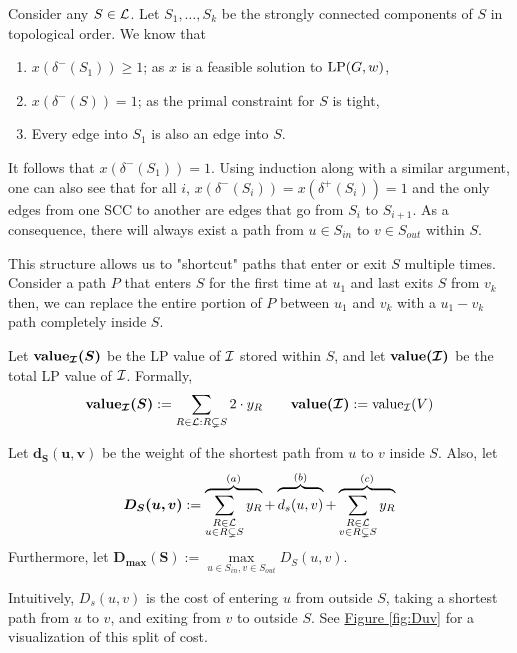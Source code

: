 
	Consider any $S\in \mathcal{L}$. Let $S_1,\dots, S_k$ be the strongly connected components of $S$ in topological order.
	We know that
	\begin{enumerate}
		\item $x(\delta^-(S_1)) \geq 1$; as $x$ is a feasible solution to $\textup{LP}(G,w)$,
		\item $x(\delta^-(S)) = 1$; as the primal constraint for $S$ is tight,
		\item Every edge into $S_1$ is also an edge into $S$.
	\end{enumerate}
	It follows that $x(\delta^-(S_1)) = 1$.
	Using induction along with a similar argument, one can also see that for all $i$, $x(\delta^-(S_i)) = x(\delta^+(S_i)) = 1$ and the only edges from one SCC to another are edges that go from $S_i$ to $S_{i + 1}$.
	As a consequence, there will always exist a path from $u\in S_{in}$ to $v\in S_{out}$ within $S$.

	This structure allows us to "shortcut" paths that enter or exit $S$ multiple times. Consider a path $P$ that enters $S$ for the first time at $u_1$ and last exits $S$ from $v_k$ then, we can replace the entire portion of $P$ between $u_1$ and $v_k$ with a $u_1 - v_k$ path completely inside $S$.\\
	

	\begin{definition}\label{def:value}
		Let $\bm{\textbf{\textup{value}}_{\mathcal{I}}(S)}$ be the LP value of $\mathcal{I}$ stored within $S$, and let $\bm{\textbf{\textup{value}}(\mathcal{I})}$ be the total LP value of $\mathcal{I}$. Formally,
		\[
			\bm{\textbf{\textup{value}}_{\mathcal{I}}(S)}:=\sum\limits_{R\in \mathcal{L}:R\subsetneq S}2\cdot y_R\qquad \bm{\textbf{\textup{value}}(\mathcal{I})}:=\textup{value}_{\mathcal{I}}(V)
		\]
	\end{definition}

	\begin{definition}
		Let $\bm{d_S(u,v)}$ be the weight of the shortest path from $u$ to $v$ inside $S$. Also, let
		\begin{equation}
			\bm{D_S(u,v)}:=\overbrace{\sum_{\substack{R\in \lam \\ u\in R\subsetneq S}}y_R}^{(a)} + \overbrace{\rule{0pt}{4mm}d_s(u,v)}^{(b)} + \overbrace{\sum_{\substack{R\in \lam \\ v\in R\subsetneq S}}y_R}^{(c)}\label{def:1}
		\end{equation}
		Furthermore, let $\bm{D_{\max}(S)} := \max\limits_{u \in S_{in}, v \in S_{out}}D_S(u,v)$.

		Intuitively, $D_s(u,v)$ is the cost of entering $u$ from outside $S$, taking a shortest path from $u$ to $v$, and exiting from $v$ to outside $S$. See \hyperref[fig:Duv]{Figure \ref{fig:Duv}} for a visualization of this split of cost.\\
	\end{definition}
	

